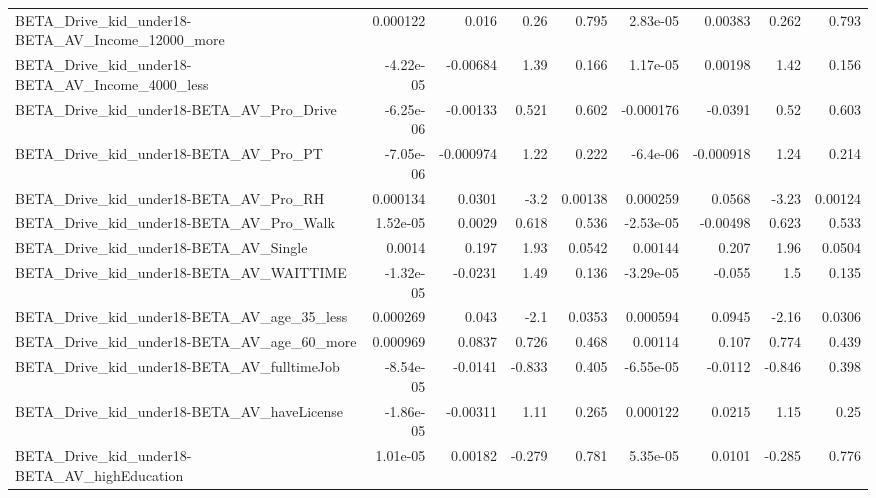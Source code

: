 \begin{tabular}{lrrrrrrrr}
BETA\_Drive\_kid\_under18-BETA\_AV\_Income\_12000\_more   &    0.000122 &        0.016 &      0.26 &    0.795 &   2.83e-05 &     0.00383 &        0.262 &         0.793 \\
BETA\_Drive\_kid\_under18-BETA\_AV\_Income\_4000\_less    &   -4.22e-05 &     -0.00684 &      1.39 &    0.166 &   1.17e-05 &     0.00198 &         1.42 &         0.156 \\
BETA\_Drive\_kid\_under18-BETA\_AV\_Pro\_Drive           &   -6.25e-06 &     -0.00133 &     0.521 &    0.602 &  -0.000176 &     -0.0391 &         0.52 &         0.603 \\
BETA\_Drive\_kid\_under18-BETA\_AV\_Pro\_PT              &   -7.05e-06 &    -0.000974 &      1.22 &    0.222 &   -6.4e-06 &   -0.000918 &         1.24 &         0.214 \\
BETA\_Drive\_kid\_under18-BETA\_AV\_Pro\_RH              &    0.000134 &       0.0301 &      -3.2 &  0.00138 &   0.000259 &      0.0568 &        -3.23 &       0.00124 \\
BETA\_Drive\_kid\_under18-BETA\_AV\_Pro\_Walk            &    1.52e-05 &       0.0029 &     0.618 &    0.536 &  -2.53e-05 &    -0.00498 &        0.623 &         0.533 \\
BETA\_Drive\_kid\_under18-BETA\_AV\_Single              &      0.0014 &        0.197 &      1.93 &   0.0542 &    0.00144 &       0.207 &         1.96 &        0.0504 \\
BETA\_Drive\_kid\_under18-BETA\_AV\_WAITTIME            &   -1.32e-05 &      -0.0231 &      1.49 &    0.136 &  -3.29e-05 &      -0.055 &          1.5 &         0.135 \\
BETA\_Drive\_kid\_under18-BETA\_AV\_age\_35\_less         &    0.000269 &        0.043 &      -2.1 &   0.0353 &   0.000594 &      0.0945 &        -2.16 &        0.0306 \\
BETA\_Drive\_kid\_under18-BETA\_AV\_age\_60\_more         &    0.000969 &       0.0837 &     0.726 &    0.468 &    0.00114 &       0.107 &        0.774 &         0.439 \\
BETA\_Drive\_kid\_under18-BETA\_AV\_fulltimeJob         &   -8.54e-05 &      -0.0141 &    -0.833 &    0.405 &  -6.55e-05 &     -0.0112 &       -0.846 &         0.398 \\
BETA\_Drive\_kid\_under18-BETA\_AV\_haveLicense         &   -1.86e-05 &     -0.00311 &      1.11 &    0.265 &   0.000122 &      0.0215 &         1.15 &          0.25 \\
BETA\_Drive\_kid\_under18-BETA\_AV\_highEducation       &    1.01e-05 &      0.00182 &    -0.279 &    0.781 &   5.35e-05 &      0.0101 &       -0.285 &         0.776 \\

\end{tabular}
